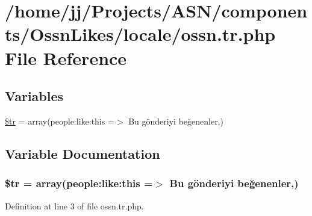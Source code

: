\hypertarget{components_2_ossn_likes_2locale_2ossn_8tr_8php}{}\section{/home/jj/\+Projects/\+A\+S\+N/components/\+Ossn\+Likes/locale/ossn.tr.\+php File Reference}
\label{components_2_ossn_likes_2locale_2ossn_8tr_8php}
\subsection*{Variables}
\begin{DoxyCompactItemize}
\item 
\hyperlink{components_2_ossn_likes_2locale_2ossn_8tr_8php_a925f466a276b200c71b2567d39b4dba7}{\$tr} = array(\textquotesingle{}people\+:like\+:this\textquotesingle{} =$>$ \textquotesingle{}Bu gönderiyi beğenenler\textquotesingle{},)
\end{DoxyCompactItemize}


\subsection{Variable Documentation}
\subsubsection[{\texorpdfstring{\$tr}{$tr}}]{\setlength{\rightskip}{0pt plus 5cm}\$tr = array(\textquotesingle{}people\+:like\+:this\textquotesingle{} =$>$ \textquotesingle{}Bu gönderiyi beğenenler\textquotesingle{},)}\hypertarget{components_2_ossn_likes_2locale_2ossn_8tr_8php_a925f466a276b200c71b2567d39b4dba7}{}\label{components_2_ossn_likes_2locale_2ossn_8tr_8php_a925f466a276b200c71b2567d39b4dba7}


Definition at line 3 of file ossn.\+tr.\+php.

